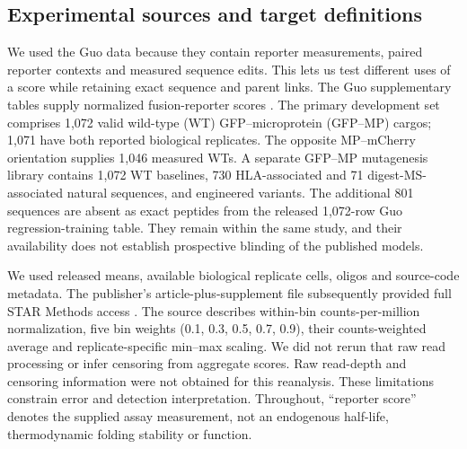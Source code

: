 \documentclass[11pt,a4paper]{article}
\begin{document}
\subsection{Experimental sources and target definitions}
We used the Guo data because they contain reporter measurements,
paired reporter contexts and measured sequence edits. This lets us test
different uses of a score while retaining exact sequence and parent links.
The Guo supplementary tables supply normalized fusion-reporter scores
\cite{guo}. The primary development set comprises 1,072 valid wild-type (WT)
GFP--microprotein (GFP--MP) cargos; 1,071 have both reported biological
replicates. The opposite MP--mCherry orientation supplies 1,046 measured WTs.
A separate GFP--MP mutagenesis library contains 1,072 WT baselines, 730
HLA-associated and 71 digest-MS-associated natural sequences, and engineered
variants. The additional 801 sequences are absent as exact peptides from the
released 1,072-row Guo regression-training table. They remain within the same
study, and their availability does not establish prospective blinding of the
published models.

We used released means, available biological replicate cells, oligos and
source-code metadata. The publisher's article-plus-supplement file subsequently
provided full STAR Methods access \cite{guo}. The source describes within-bin
counts-per-million normalization, five bin weights (0.1, 0.3, 0.5, 0.7, 0.9),
their counts-weighted average and replicate-specific min--max scaling.
We did not rerun that raw read processing or infer censoring from aggregate
scores. Raw read-depth and censoring information were not obtained for this
reanalysis. These limitations constrain error and detection interpretation.
Throughout, ``reporter score'' denotes the supplied assay measurement, not an
endogenous half-life, thermodynamic folding stability or function.
\end{document}
